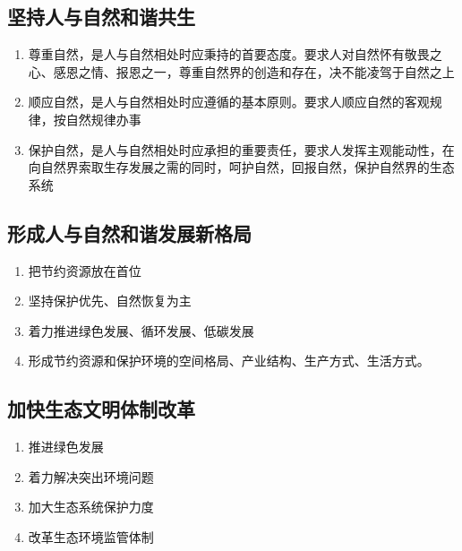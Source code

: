     \subsection{坚持人与自然和谐共生}
        \begin{enumerate}
            \item 尊重自然，是人与自然相处时应秉持的首要态度。要求人对自然怀有敬畏之心、感恩之情、报恩之一，尊重自然界的创造和存在，决不能凌驾于自然之上
            \item 顺应自然，是人与自然相处时应遵循的基本原则。要求人顺应自然的客观规律，按自然规律办事
            \item 保护自然，是人与自然相处时应承担的重要责任，要求人发挥主观能动性，在向自然界索取生存发展之需的同时，呵护自然，回报自然，保护自然界的生态系统
        \end{enumerate}

    \subsection{形成人与自然和谐发展新格局}
        \begin{enumerate}
            \item 把节约资源放在首位
            \item 坚持保护优先、自然恢复为主
            \item 着力推进绿色发展、循环发展、低碳发展
            \item 形成节约资源和保护环境的空间格局、产业结构、生产方式、生活方式。
        \end{enumerate}

    \subsection{加快生态文明体制改革}
        \begin{enumerate}
            \item 推进绿色发展
            \item 着力解决突出环境问题
            \item 加大生态系统保护力度
            \item 改革生态环境监管体制
        \end{enumerate}
